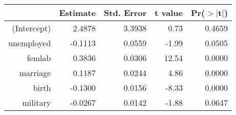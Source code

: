 \begin{table}[ht]
\centering
\begin{tabular}{rrrrr}
  \hline
 & Estimate & Std. Error & t value & Pr($>$$|$t$|$) \\ 
  \hline
(Intercept) & 2.4878 & 3.3938 & 0.73 & 0.4659 \\ 
  unemployed & -0.1113 & 0.0559 & -1.99 & 0.0505 \\ 
  femlab & 0.3836 & 0.0306 & 12.54 & 0.0000 \\ 
  marriage & 0.1187 & 0.0244 & 4.86 & 0.0000 \\ 
  birth & -0.1300 & 0.0156 & -8.33 & 0.0000 \\ 
  military & -0.0267 & 0.0142 & -1.88 & 0.0647 \\ 
   \hline
\end{tabular}
\end{table}
